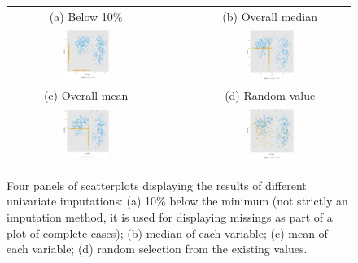 \documentclass[article]{jss}
\begin{document}
\begin{center}
\begin{figure}[h]
\begin{centering}
\begin{tabular}{cccc}
{\tiny{(a) Below 10\%}} &  &  & {\tiny{(b) Overall median}}\tabularnewline
\includegraphics[width=0.31\textwidth]{graph/fig3-1-below10} &  &  & \includegraphics[width=0.31\textwidth]{graph/fig3-2-median}\tabularnewline
{\tiny{(c) Overall mean}} &  &  & {\tiny{(d) Random value}}\tabularnewline
\includegraphics[width=0.31\textwidth]{graph/fig3-3-mean} &  &  & \includegraphics[width=0.31\textwidth]{graph/fig3-4-random}\tabularnewline
\end{tabular}
\par\end{centering}
\caption{Four panels of scatterplots displaying the results of
different univariate imputations: (a) 10\% below the minimum
(not strictly an imputation method, it is used for displaying
missings as part of a plot of complete cases); (b) median of
each variable; (c) mean of each variable; (d) random selection
from the existing values.}
\label{fig:univariate-imputation}
\end{figure}
\par\end{center}
\end{document}
